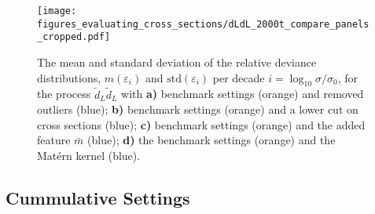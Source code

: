 \documentclass[twoside,english]{uiofysmaster}
\begin{document}
{\begin{figure}
\texttt{[image: figures\_evaluating\_cross\_sections/dLdL\_2000t\_compare\_panels\_cropped.pdf]}
\caption{The mean and standard deviation of the relative deviance distributions, $m(\varepsilon_i)$ and $\mathrm{std}(\varepsilon_i)$ per decade $i=\log_{10} \sigma/ \sigma_0$, for the process $\widetilde{d}_L \widetilde{d}_L$ with \textbf{a)} benchmark settings (orange) and removed outliers (blue); \textbf{b)} benchmark settings (orange) and a lower cut on cross sections (blue); \textbf{c)} benchmark settings (orange) and the added feature $\bar{m}$ (blue); \textbf{d)} the benchmark settings (orange) and the Mat\'{e}rn kernel (blue).}
\label{Fig:: evaluating cross : RD compare panels dLdL}
\end{figure}


\subsection{Cummulative Settings}\label{Sec:: evaluating cross : Optimal Settings}

}
\end{document}
